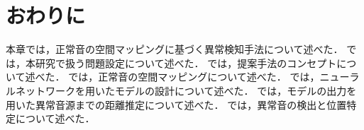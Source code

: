 \documentclass[../main]{subfiles}
\begin{document}
\section{おわりに}
\label{sec:pmethod_conclusion}

本章では，正常音の空間マッピングに基づく異常検知手法について述べた．
では，本研究で扱う問題設定について述べた．
では，提案手法のコンセプトについて述べた．
では，正常音の空間マッピングについて述べた．
では，ニューラルネットワークを用いたモデルの設計について述べた．
では，モデルの出力を用いた異常音源までの距離推定について述べた．
では，異常音の検出と位置特定について述べた．
\end{document}
